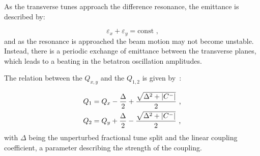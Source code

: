 As the transverse tunes approach the difference resonance, the emittance is described by:

\begin{equation}
    \varepsilon_x + \varepsilon_y = \mathrm{const} \text{ ,}
    \label{equation:coupled_emittances_difference_resonance}
\end{equation}
and as the resonance is approached the beam motion may not become unstable.
Instead, there is a periodic exchange of emittance between the transverse planes, which leads to a beating in the betatron oscillation amplitudes.

The relation between the  \(Q_{x,y}\) and the  \(Q_{1,2}\) is given by~\cite{CAS:Bryant:Theory_Weak_Betatron_Coupling}:

\begin{equation}
    \begin{aligned}
        Q_1 &= Q_x- \frac{\Delta}{2} + \frac{\sqrt{\Delta^2 + \left\lvert C^{-} \right\rvert}}{2} \text{ ,} \\
        Q_2 &= Q_y+ \frac{\Delta}{2} - \frac{\sqrt{\Delta^2 + \left\lvert C^{-} \right\rvert}}{2} \text{ ,}
    \end{aligned}
    \label{equation:unperturbed_tunes_to_coupled_tunes}
\end{equation}
with \(\Delta\) being the unperturbed fractional tune split and \AbsCminus the linear coupling coefficient, a parameter describing the strength of the coupling.

